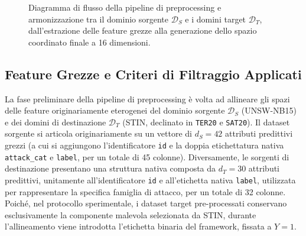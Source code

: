 \begin{figure}[H]
\caption{Diagramma di flusso della pipeline di preprocessing e armonizzazione tra il dominio sorgente $\mathcal{D}_S$ e i domini target $\mathcal{D}_T$, dall'estrazione delle feature grezze alla generazione dello spazio coordinato finale a 16 dimensioni.}
\label{fig:preprocessing_pipeline}
\end{figure}

\subsection{Feature Grezze e Criteri di Filtraggio Applicati}
\label{subsec:feature_grezze}

La fase preliminare della pipeline di preprocessing è volta ad allineare gli spazi delle feature originariamente eterogenei del dominio sorgente $\mathcal{D}_S$ (UNSW-NB15) e dei domini di destinazione $\mathcal{D}_T$ (STIN, declinato in \texttt{TER20} e \texttt{SAT20}). 
Il dataset sorgente si articola originariamente su un vettore di $d_S = 42$ attributi predittivi grezzi (a cui si aggiungono l'identificatore \texttt{id} e la doppia etichettatura nativa \texttt{attack\_cat} e \texttt{label}, per un totale di 45 colonne). 
Diversamente, le sorgenti di destinazione presentano una struttura nativa composta da $d_T=30$ attributi predittivi, unitamente all'identificatore \texttt{id} e all'etichetta nativa \texttt{label}, utilizzata per rappresentare la specifica famiglia di attacco, per un totale di 32 colonne. 
Poiché, nel protocollo sperimentale, i dataset target pre-processati conservano esclusivamente la componente malevola selezionata da STIN, durante l'allineamento viene introdotta l'etichetta binaria del framework, fissata a $Y = 1$.

